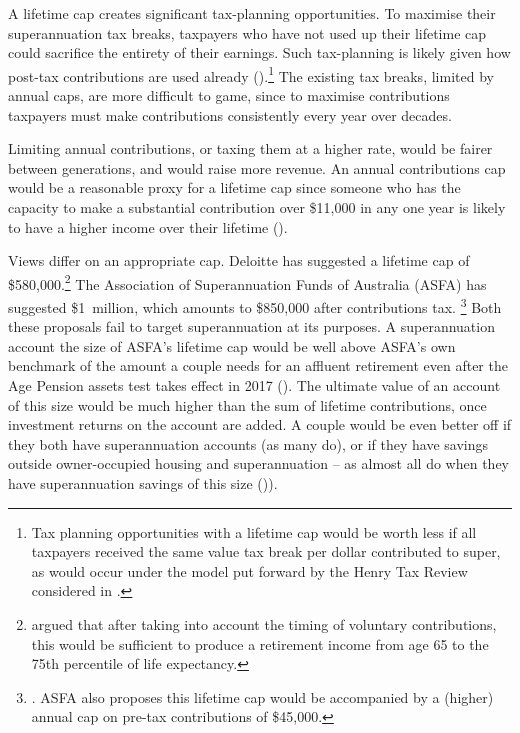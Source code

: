 \documentclass{grattanAlpha}
\begin{document}
A lifetime cap creates significant tax-planning opportunities. To maximise their superannuation tax breaks, taxpayers who have not used up their lifetime cap could sacrifice the entirety of their earnings. Such tax-planning is likely given how post-tax contributions are used already ().\footnote{Tax planning opportunities with a lifetime cap would be worth less if all taxpayers received the same value tax break per dollar contributed to super, as would occur under the model put forward by the Henry Tax Review considered in .}  The existing tax breaks, limited by annual caps, are more difficult to game, since to maximise contributions taxpayers must make contributions consistently every year over decades.  

Limiting annual contributions, or taxing them at a higher rate, would be fairer between generations, and would raise more revenue. An annual contributions cap would be a reasonable proxy for a lifetime cap since someone who has the capacity to make a substantial contribution over \$11,000 in any one year is likely to have a higher income over their lifetime ().

Views differ on an appropriate cap. Deloitte has suggested a lifetime cap of \$580,000.\footnote{\textcite[][18]{Deloitte2015DynamicsofAusSuper} argued that after taking into account the timing of voluntary contributions, this would be sufficient to produce a retirement income from age 65 to the 75th percentile of life expectancy.} The Association of Superannuation Funds of Australia (ASFA) has suggested \$1~million, which amounts to \$850,000 after contributions tax.%
\footnote{\textcite[][39]{ASFA2015TreasurySubmission}. ASFA also proposes this lifetime cap would be accompanied by a (higher) annual cap on pre-tax contributions of \$45,000.}
Both these proposals fail to target superannuation at its purposes. A superannuation account the size of ASFA’s lifetime cap would be well above ASFA’s own benchmark of the amount a couple needs for an affluent retirement even after the Age Pension assets test takes effect in 2017 (). The ultimate value of an account of this size would be much higher than the sum of lifetime contributions, once investment returns on the account are added. A couple would be even better off if they both have superannuation accounts (as many do), or if they have savings outside owner-occupied housing and superannuation – as almost all do when they have superannuation savings of this size ()). 
\end{document}
